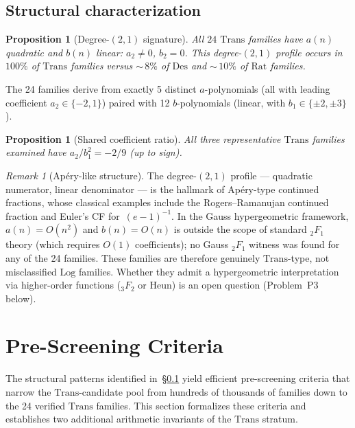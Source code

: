 \documentclass[12pt, reqno]{amsart}
\newtheorem{proposition}[theorem]{Proposition}
\theoremstyle{definition}
\theoremstyle{remark}
\newtheorem{remark}[theorem]{Remark}
\newcommand{\Rat}{\mathrm{Rat}}
\newcommand{\Log}{\mathrm{Log}}
\newcommand{\Trans}{\mathrm{Trans}}
\newcommand{\Des}{\mathrm{Des}}
\begin{document}
\subsection{Structural characterization}\label{ssec:structural}

\begin{proposition}[Degree-$(2,1)$ signature]\label{prop:deg21}
All $24$ $\Trans$ families have
$a(n)$ quadratic and $b(n)$ linear: $a_2 \ne 0$, $b_2 = 0$.
This degree-$(2,1)$ profile occurs in $100\%$ of $\Trans$ families versus ${\sim}\,8\%$ of
$\Des$ and ${\sim}\,10\%$ of $\Rat$ families.
\end{proposition}

The 24 families derive from exactly 5 distinct $a$-polynomials (all with
leading coefficient $a_2 \in \{-2, 1\}$) paired with 12 $b$-polynomials (linear,
with $b_1 \in \{\pm 2, \pm 3\}$).

\begin{proposition}[Shared coefficient ratio]\label{prop:ratio}
All three representative
$\Trans$ families examined have $a_2/b_1^2 = -2/9$ (up to sign).
\end{proposition}

\begin{remark}[Ap\'ery-like structure]\label{rem:apery}
The degree-$(2,1)$ profile --- quadratic
numerator, linear denominator --- is the hallmark of Ap\'ery-type continued
fractions, whose classical examples include the Rogers--Ramanujan continued
fraction and Euler's CF for~$(e-1)^{-1}$. In the Gauss hypergeometric framework,
$a(n) = O(n^2)$ and $b(n) = O(n)$ is outside the scope of standard ${}_2F_1$ theory
(which requires $O(1)$ coefficients); no Gauss ${}_2F_1$ witness was found for any
of the 24 families. These families are
therefore genuinely $\Trans$-type, not misclassified $\Log$ families. Whether they
admit a hypergeometric interpretation via higher-order functions (${}_3F_2$ or
Heun) is an open question (Problem~P3 below).
\end{remark}


\section{Pre-Screening Criteria}\label{sec:prescreen}

The structural patterns identified in~\S\ref{ssec:structural} yield efficient pre-screening
criteria that narrow the $\Trans$-candidate pool from hundreds of thousands of
families down to the 24 verified $\Trans$ families. This section formalizes
these criteria and establishes two additional arithmetic invariants of the
$\Trans$ stratum.
\end{document}
